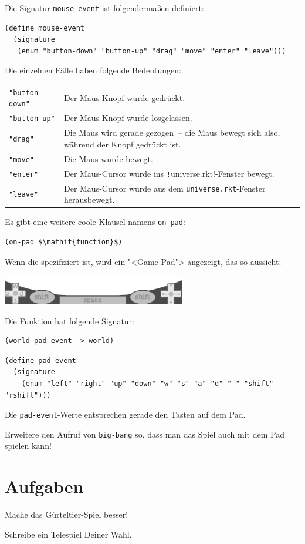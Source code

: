 Die Signatur \lstinline{mouse-event} ist folgendermaßen definiert:
%
\begin{lstlisting}
(define mouse-event
  (signature
   (enum "button-down" "button-up" "drag" "move" "enter" "leave")))
\end{lstlisting}
%
Die einzelnen Fälle haben folgende Bedeutungen:
%
\begin{center}
  \begin{tabular}{lp{4in}}
  \lstinline!"button-down"! & Der Maus-Knopf wurde gedrückt.\\
  \lstinline!"button-up"! & Der Maus-Knopf wurde losgelassen.\\
  \lstinline!"drag"! & Die Maus wird gerade gezogen~-- die Maus bewegt
  sich also, während der Knopf gedrückt ist.\\
  \lstinline!"move"! & Die Maus wurde bewegt.\\
  \lstinline!"enter"! & Der Maus-Cursor wurde ins
  \texttt!universe.rkt!-Fenster bewegt.\\
  \lstinline!"leave"! & Der Maus-Cursor wurde aus dem
                        \texttt{universe.rkt}-Fenster herausbewegt.
  \end{tabular}
\end{center}
%
Es gibt eine weitere coole Klausel namens \lstinline{on-pad}:
%
\begin{lstlisting}
(on-pad $\mathit{function}$)
\end{lstlisting}
%
Wenn die spezifiziert ist, wird ein "<Game-Pad"> angezeigt, das so
aussieht:
%
\begin{center}
  \includegraphics[width=0.6\textwidth]{videospiele/gamepad}
\end{center}
%
Die Funktion hat folgende Signatur:
%
\begin{lstlisting}
(world pad-event -> world)
\end{lstlisting}
%
\begin{lstlisting}
(define pad-event
  (signature
    (enum "left" "right" "up" "down" "w" "s" "a" "d" " " "shift" "rshift")))
\end{lstlisting}
%
Die \lstinline{pad-event}-Werte entsprechen gerade den Tasten auf dem Pad.

\begin{aufgabeinline}
  Erweitere den Aufruf von \lstinline{big-bang} so, dass man das Spiel
  auch mit dem Pad spielen kann!
\end{aufgabeinline}

\section*{Aufgaben}

\begin{aufgabe}
  Mache das Gürteltier-Spiel besser!
\end{aufgabe}

\begin{aufgabe}
  Schreibe ein Telespiel Deiner Wahl.
\end{aufgabe}


